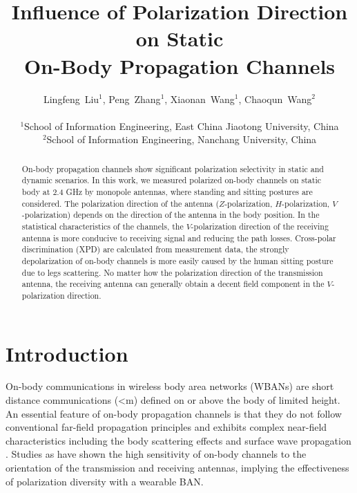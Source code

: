\documentclass[conference]{IEEEtran}
\begin{document}
\title{Influence of Polarization Direction on Static \\ On-Body Propagation Channels}
\author{Lingfeng~Liu$^1$, Peng~Zhang$^1$, Xiaonan~Wang$^1$, Chaoqun~Wang$^2$\\
\\
$^1$School of Information Engineering, East China Jiaotong University, China \\
$^2$School of Information Engineering,  Nanchang University, China}

\maketitle
\begin{abstract}
On-body propagation channels show significant polarization selectivity in static and dynamic scenarios. In this work, we measured polarized on-body channels on static body at 2.4 GHz by monopole antennas, where standing and sitting postures are considered. The polarization direction of the antenna ($Z$-polarization, $H$-polarization, $V$-polarization) depends on the direction of the antenna in the body position. In the statistical characteristics of the channels, the $V$-polarization direction of the receiving antenna is more conducive to receiving signal and reducing the path losses. Cross-polar discrimination (XPD) are calculated from measurement data, the strongly depolarization of on-body channels is more easily caused by the human sitting posture due to legs scattering. No matter how the polarization direction of the transmission antenna, the receiving antenna can generally obtain a decent field component in the $V$-polarization direction.
\end{abstract}


\section{Introduction}
On-body communications in wireless body area networks (WBANs) are short distance communications (\textless{}\;m) \cite{1} defined on or above the body of limited height. An essential feature of on-body propagation channels is that they do not follow conventional far-field propagation principles and exhibits complex near-field characteristics including the body scattering effects \cite{2} and surface wave propagation \cite{3}. Studies as \cite{4} have shown the high sensitivity of on-body channels to the orientation of the transmission and receiving antennas, implying the effectiveness of polarization diversity with a wearable BAN.
\end{document}
